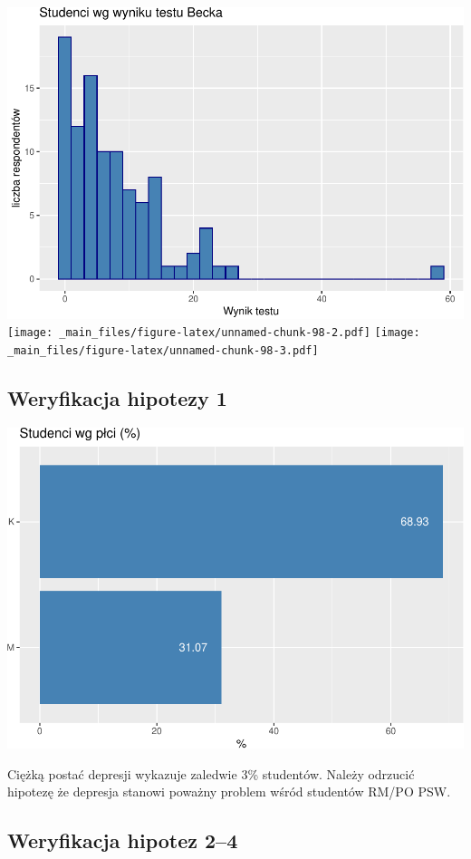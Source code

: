 \documentclass[
  openany]{book}
\begin{document}
\includegraphics{_main_files/figure-latex/unnamed-chunk-98-1.pdf} \texttt{[image: \_main\_files/figure-latex/unnamed-chunk-98-2.pdf]} \texttt{[image: \_main\_files/figure-latex/unnamed-chunk-98-3.pdf]}

\hypertarget{weryfikacja-hipotezy-1-1}{%
\subsection{Weryfikacja hipotezy 1}\label{weryfikacja-hipotezy-1-1}}

\includegraphics{_main_files/figure-latex/unnamed-chunk-99-1.pdf}

Ciężką postać depresji wykazuje zaledwie 3\% studentów. Należy odrzucić hipotezę
że depresja stanowi poważny problem wśród studentów RM/PO PSW.

\hypertarget{weryfikacja-hipotez-24}{%
\subsection{Weryfikacja hipotez 2--4}\label{weryfikacja-hipotez-24}}
\end{document}
